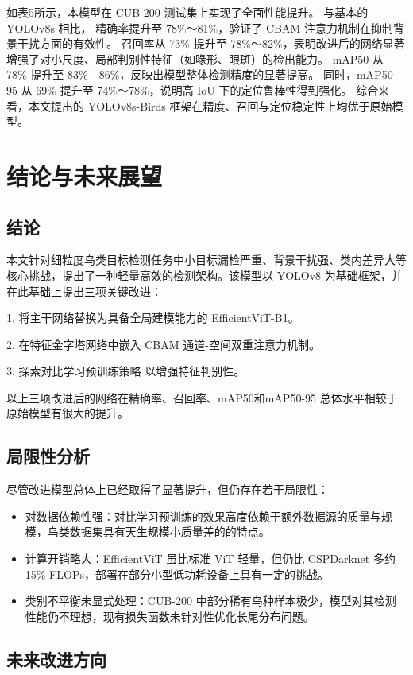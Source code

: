 \documentclass[12pt]{ctexart}
\begin{document}
\newpage
如表5所示，本模型在 CUB-200 测试集上实现了全面性能提升。
与基本的 YOLOv8s 相比，
精确率提升至 78\%～81\%，验证了 CBAM 注意力机制在抑制背景干扰方面的有效性。
召回率从 73\% 提升至 78\%～82\%，表明改进后的网络显著增强了对小尺度、局部判别性特征（如喙形、眼斑）的检出能力。
mAP50 从 78\% 提升至 83\% - 86\%，反映出模型整体检测精度的显著提高。
同时，mAP50-95 从 69\% 提升至 74\%～78\%，说明高 IoU 下的定位鲁棒性得到强化。
综合来看，本文提出的 YOLOv8s-Birds 框架在精度、召回与定位稳定性上均优于原始模型。


\section{结论与未来展望}
\subsection{结论}

本文针对细粒度鸟类目标检测任务中小目标漏检严重、背景干扰强、类内差异大等核心挑战，提出了一种轻量高效的检测架构。该模型以 YOLOv8 为基础框架，并在此基础上提出三项关键改进：

1. 将主干网络替换为具备全局建模能力的 EfficientViT-B1。

2. 在特征金字塔网络中嵌入 CBAM 通道-空间双重注意力机制。

3. 探索对比学习预训练策略 以增强特征判别性。

以上三项改进后的网络在精确率、召回率、mAP50和mAP50-95 总体水平相较于原始模型有很大的提升。

\subsection{局限性分析}
尽管改进模型总体上已经取得了显著提升，但仍存在若干局限性：
\begin{itemize}
  \item 对数据依赖性强：对比学习预训练的效果高度依赖于额外数据源的质量与规模，鸟类数据集具有天生规模小质量差的的特点。
  \item 计算开销略大：EfficientViT 虽比标准 ViT 轻量，但仍比 CSPDarknet 多约 15\% FLOPs，部署在部分小型低功耗设备上具有一定的挑战。
  \item 类别不平衡未显式处理：CUB-200 中部分稀有鸟种样本极少，模型对其检测性能仍不理想，现有损失函数未针对性优化长尾分布问题。
\end{itemize}

\subsection{未来改进方向}
\end{document}
